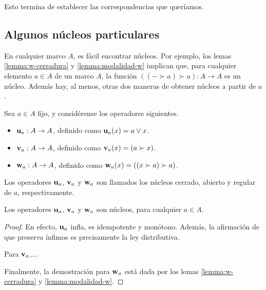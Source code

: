 Esto termina de establecer las correspondencias que queríamos.

\subsection{Algunos núcleos particulares}

En cualquier marco $A$, es fácil encontrar núcleos.
Por ejemplo, los lemas \ref{lemma:w-cerradura}
y \ref{lemma:modalidad-w} implican que, para cualquier elemento
$a\in A$ de un marco $A$, la función $((-\succ a)\succ a):A\to A$
es un núcleo.
Además hay, al menos, otras dos maneras de obtener núcleos
a partir de $a$.

\begin{defn}
Sea $a\in A$ fijo, y considérense los operadores siguientes.
  \begin{itemize}
    \item $\mathbf u_{a}:A\to A$, definido como $\mathbf u_{a}(x)= a\vee x$.
    \item $\mathbf v_{a}:A\to A$, definido como $\mathbf v_{a}(x)=(a\succ
    x)$.
    \item $\mathbf w_{a}:A\to A$, definido como
      $\mathbf w_{a}(x)=((x\succ a)\succ a)$.
  \end{itemize}
  Los operadores $\mathbf u_{a}$, $\mathbf v_{a}$ y $\mathbf w_{a}$ son llamados
  los núcleos cerrado, abierto y regular de $a$, respectivamente.
\end{defn}
\begin{prop}
  Los operadores $\mathbf u_{a}$, $\mathbf v_{a}$ y $\mathbf w_{a}$ son núcleos, para
  cualquier $a\in A$.
\end{prop}
\begin{proof}
  En efecto, $\mathbf u_{a}$ infla, es idempotente
  y monótono. Además, la afirmación de que preserva ínfimos es
  precisamente la ley distributiva.

  Para $\mathbf v_{a}$,...

  Finalmente, la demostración para $\mathbf w_{a}$ está
  dada por los lemas \ref{lemma:w-cerradura} y
  \ref{lemma:modalidad-w}.
\end{proof}


